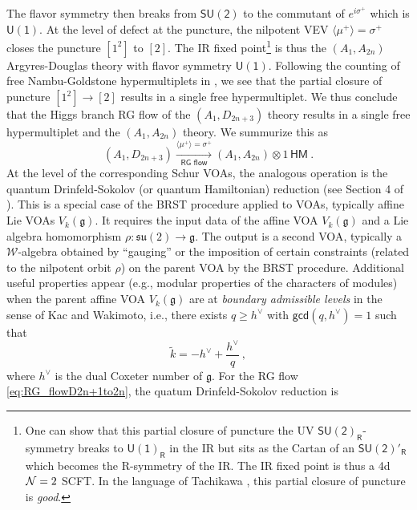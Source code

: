 \documentclass[a4paper,10pt]{article}
\newcommand{\mr}[1]{\mathsf{#1}}
\newcommand{\tsf}[1]{\textsf{#1}}
\newcommand{\mf}[1]{\mathfrak{#1}}
\def\CN {{\cal N}}
\begin{document}
The flavor symmetry then breaks from $\mr{SU(2)}$ to the commutant of $e^{i\sigma^+}$ which is $\mr{U(1)}$. At the level of defect at the puncture, the nilpotent \tsf{VEV} $\langle\mu^+\rangle=\sigma^+$ closes the puncture $[1^2]$ to $[2]$. The \tsf{IR} fixed point\footnote{One can show that this partial closure of puncture the \tsf{UV} $\mr{SU(2)_R}$-symmetry breaks to $\mr{U(1)_R}$ in the \tsf{IR} but sits as the Cartan of an $\mr{SU(2)'_R}$ which becomes the \tsf{R}-symmetry of the \tsf{IR}. The \tsf{IR} fixed point is thus a 4d $\CN=2$ \tsf{SCFT}. In the language of Tachikawa \cite{Tachikawa:2015bga}, this partial closure of puncture is \textit{good}.} is thus the $(A_1,A_{2n})$ Argyres-Douglas theory with flavor symmetry $\mr{U(1)}$. Following the counting of free Nambu-Goldstone hypermultiplets in \cite{Tachikawa:2015bga}, we see that the partial closure of puncture $[1^2]\to[2]$ results in a single free hypermultiplet. We thus conclude that the Higgs branch \tsf{RG} flow of the $(A_1,D_{2n+3})$ theory results in a single free hypermultiplet and the $(A_1,A_{2n})$ theory. We summurize this as 
\begin{equation}\label{eq:RG_flowD2n+1to2n}
(A_1,D_{2n+3})\xrightarrow[\tsf{RG flow}]{\langle\mu^+\rangle=\sigma^+} (A_1,A_{2n})\otimes 1\,\mr{HM}~.   
\end{equation}
At the level of the corresponding Schur \tsf{VOA}s, the analogous operation is the quantum Drinfeld-Sokolov (or quantum Hamiltonian) reduction (see Section 4 of \cite{Beem:2014rza}). This is a special case of the \tsf{BRST} procedure applied to \tsf{VOA}s, typically affine Lie \tsf{VOA}s $V_k(\mathfrak{g})$. It requires the input data of the affine \tsf{VOA} $V_k(\mathfrak{g})$ and a Lie algebra homomorphism $\rho:\mf{su}(2)\longrightarrow\mathfrak{g}$. The output is a second \tsf{VOA}, typically a $\mathcal{W}$-algebra obtained by ``gauging'' or the imposition of certain constraints (related to the nilpotent orbit $\rho$) on the parent \tsf{VOA} by the \tsf{BRST} procedure. Additional useful properties appear (e.g., modular properties of the characters of modules) when the parent affine \tsf{VOA} $V_k(\mathfrak{g})$ are at \textit{boundary admissible levels} in the sense of Kac and Wakimoto, i.e., there exists $q\geq h^\vee$ with $\mr{gcd}(q,h^\vee)=1$ such that
\begin{equation}
    \tilde{k}=-h^{\vee}+\frac{h^{\vee}}{q}~, 
\end{equation}
where $h^\vee$ is the dual Coxeter number of $\mf{g}$. For the \tsf{RG} flow \eqref{eq:RG_flowD2n+1to2n}, the quatum Drinfeld-Sokolov reduction is \cite{adamovic2019realizations}
\end{document}
